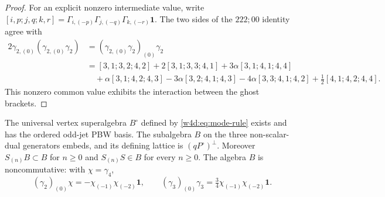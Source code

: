 \begin{proof}
For an explicit nonzero intermediate value, write
$[i,p;j,q;k,r]=\Gamma_{i,(-p)}\Gamma_{j,(-q)}\Gamma_{k,(-r)}\mathbf1$.
The two sides of the $222;00$ identity agree with
\begin{align*}
 2\gamma_{2,(0)}(\gamma_{2,(0)}\gamma_2)
  &=(\gamma_{2,(0)}\gamma_2)_{(0)}\gamma_2\\
  &=[3,1;3,2;4,2]+2[3,1;3,3;4,1]
    +3\alpha[3,1;4,1;4,4]\\
  &\quad+\alpha[3,1;4,2;4,3]-3\alpha[3,2;4,1;4,3]
    -4\alpha[3,3;4,1;4,2]+\tfrac12[4,1;4,2;4,4].
\end{align*}
This nonzero common value exhibits the interaction between the ghost brackets.
\end{proof}

\begin{proposition}\label{w4d:prop:dual-PBW}
The universal vertex superalgebra $B^\circ$ defined by \eqref{w4d:eq:mode-rule} exists and has the ordered odd-jet PBW basis. The subalgebra $B$ on the three non-scalar-dual generators embeds, and its defining lattice is $(qP^\circ)^\perp$. Moreover $S_{(n)}B\subset B$ for $n\geq0$ and $S_{(n)}S\in B$ for every $n\geq0$. The algebra $B$ is noncommutative: with $\chi=\gamma_4$,
\[
 (\gamma_2)_{(0)}\chi=-\chi_{(-1)}\chi_{(-2)}\mathbf1,
 \qquad (\gamma_3)_{(0)}\gamma_3=
 \tfrac34\chi_{(-1)}\chi_{(-2)}\mathbf1.
\]
\end{proposition}
